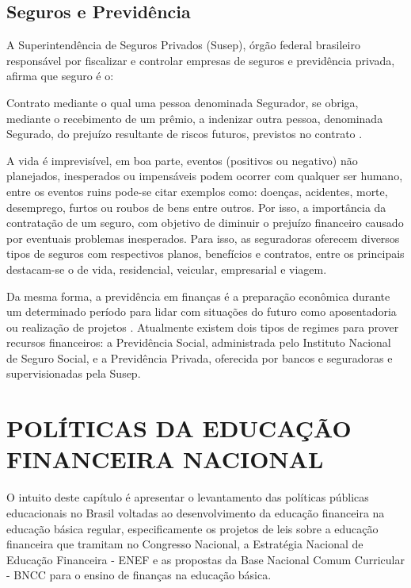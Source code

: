 \subsection{Seguros e Previdência}
A Superintendência de Seguros Privados (Susep), órgão federal brasileiro responsável por fiscalizar e controlar empresas de seguros e previdência privada, afirma que seguro é o:

\begin{citacao}
Contrato mediante o qual uma pessoa denominada Segurador, se obriga, mediante o recebimento de um prêmio, a indenizar outra pessoa, denominada Segurado, do prejuízo resultante de riscos futuros, previstos no contrato \cite{susep2007}.
\end{citacao}

A vida é imprevisível, em boa parte, eventos (positivos ou negativo) não planejados, inesperados ou impensáveis podem ocorrer com qualquer ser humano, entre os eventos ruins pode-se citar exemplos como: doenças, acidentes, morte, desemprego, furtos ou roubos de bens entre outros. Por isso, a importância da contratação de um seguro, com objetivo de diminuir o prejuízo financeiro causado por eventuais problemas inesperados. Para isso, as seguradoras oferecem diversos tipos de seguros com respectivos planos, benefícios e contratos, entre os principais destacam-se o de vida, residencial, veicular, empresarial e viagem.

Da mesma forma, a previdência em finanças é a preparação econômica durante um determinado período para lidar com situações do futuro como aposentadoria ou realização de projetos \cite{bb2015}. Atualmente existem dois tipos de regimes para prover recursos financeiros: a Previdência Social, administrada pelo Instituto Nacional de Seguro Social, e a Previdência Privada, oferecida por bancos e seguradoras e supervisionadas pela Susep.

\section{POLÍTICAS DA EDUCAÇÃO FINANCEIRA NACIONAL}
O intuito deste capítulo é apresentar o levantamento das políticas públicas educacionais no Brasil voltadas ao desenvolvimento da educação financeira na educação básica regular, especificamente os projetos de leis sobre a educação financeira que tramitam no Congresso Nacional, a Estratégia Nacional de Educação Financeira - ENEF e as propostas da Base Nacional Comum Curricular - BNCC para o ensino de finanças na educação básica.

